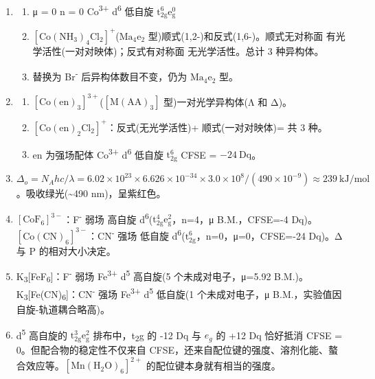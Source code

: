 \begin{enumerate}
\def\labelenumi{\arabic{enumi}.}
\setcounter{enumi}{9}
\item
  \begin{enumerate}
  \def\labelenumii{(\arabic{enumii})}
  \tightlist
  \item
    μ = 0 \箭 n = 0 \箭 Co\textsuperscript{3+} d\textsuperscript{6} 低自旋 \箭 \(\mathrm{t_{2g}^6 e_g^0}\)
  \item
    \(\mathrm{[Co(NH_3)_4Cl_2]^+}\)(\(\mathrm{Ma_4e_2}\) 型)\箭 顺式(1,2-)和反式(1,6-)。顺式无对称面 \箭 有光学活性(一对对映体)；反式有对称面 \箭 无光学活性。总计 3 种异构体。
  \item
    替换为 Br\textsuperscript{-} 后异构体数目不变，仍为 \(\mathrm{Ma_4e_2}\) 型。
  \end{enumerate}
\item
  \begin{enumerate}
  \def\labelenumii{(\arabic{enumii})}
  \tightlist
  \item
    \([\mathrm{Co(en)_3}]^{3+}\)(\(\mathrm{[M(AA)_3]}\) 型)\箭 一对光学异构体(Λ 和 Δ)。
  \item
    \([\mathrm{Co(en)_2Cl_2}]^+\)：反式(无光学活性)+ 顺式(一对对映体)= 共 3 种。
  \item
    en 为强场配体 \箭 Co\textsuperscript{3+} d\textsuperscript{6} 低自旋 \箭 \(\mathrm{t_{2g}^6}\) \箭 CFSE = \(-24\ \mathrm{Dq}\)。
  \end{enumerate}
\item
  \(\Delta_o = N_A hc/\lambda = 6.02\times10^{23} \times 6.626\times10^{-34} \times 3.0\times10^8 / (490\times10^{-9}) \approx 239\ \mathrm{kJ/mol}\)。吸收绿光(\textasciitilde490 nm)，呈紫红色。
\item
  \([\mathrm{CoF_6}]^{3-}\)：F\textsuperscript{-} 弱场 \箭 高自旋 d\textsuperscript{6}(\(\mathrm{t_{2g}^4 e_g^2}\)，n=4，μ B.M.，CFSE=-4 Dq)。\([\mathrm{Co(CN)_6}]^{3-}\)：CN\textsuperscript{-} 强场 \箭 低自旋 d\textsuperscript{6}(\(\mathrm{t_{2g}^6}\)，n=0，μ=0，CFSE=-24 Dq)。Δ 与 P 的相对大小决定。
\item
  K\textsubscript{3}{[}FeF\textsubscript{6}{]}：F\textsuperscript{-} 弱场 \箭 Fe\textsuperscript{3+} d\textsuperscript{5} 高自旋(5 个未成对电子，μ=5.92 B.M.)。K\textsubscript{3}{[}Fe(CN)\textsubscript{6}{]}：CN\textsuperscript{-} 强场 \箭 Fe\textsuperscript{3+} d\textsuperscript{5} 低自旋(1 个未成对电子，μ B.M.，实验值因自旋-轨道耦合略高)。
\item
  d\textsuperscript{5} 高自旋的 \(\mathrm{t_{2g}^3 e_g^2}\) 排布中，t\textsubscript{2}g 的 -12 Dq 与 \(e_g\) 的 +12 Dq 恰好抵消 \箭 CFSE = 0。但配合物的稳定性不仅来自 CFSE，还来自配位键的强度、溶剂化能、螯合效应等。\([\mathrm{Mn(H_2O)_6}]^{2+}\) 的配位键本身就有相当的强度。
\end{enumerate}

